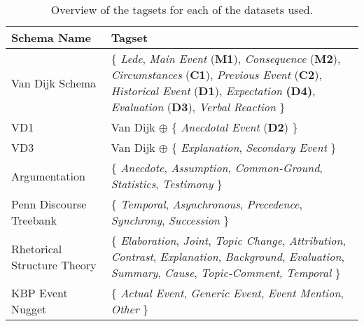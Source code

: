 \documentclass[11pt]{article}
\newcommand\nd{VD1\xspace}
\newcommand\spangh{VD3\xspace}
\begin{document}
\begin{table*}[t]
    \centering
    \begin{tabular}{|p{3cm}|p{12cm}|}
        \hline
        \textbf{Schema Name} & \textbf{Tagset} \\
        \hline
        \hline
         Van Dijk Schema &  $\{$ \textit{Lede},
        \textit{Main Event} (\textbf{M1}), \textit{Consequence} (\textbf{M2}), \textit{Circumstances} (\textbf{C1}), \textit{Previous Event} (\textbf{C2}), \textit{Historical Event} (\textbf{D1}), \textit{Expectation} \textbf{(D4)}, \textit{Evaluation} (\textbf{D3}), \textit{Verbal Reaction} $\}$ \\
        \hline
        \nd & Van Dijk $\oplus$ $\{$ \textit{Anecdotal Event} (\textbf{D2}) $\}$\\
        \hline
        \spangh & Van Dijk $\oplus$ $\{$ \textit{Explanation}, \textit{Secondary Event} $\}$ \\
        \hline
        \hline
        Argumentation & $\{$ \textit{Anecdote}, \textit{Assumption}, \textit{Common-Ground}, \textit{Statistics}, \textit{Testimony} $\}$ \\
        \hline
        \hline
        Penn Discourse Treebank & $\{$ \textit{Temporal}, \textit{Asynchronous}, \textit{Precedence}, \textit{Synchrony}, \textit{Succession} $\}$ \\
        \hline
        Rhetorical Structure Theory & $\{$ \textit{Elaboration}, \textit{Joint},  \textit{Topic Change},  \textit{Attribution}, \textit{Contrast}, \textit{Explanation}, \textit{Background},
        \textit{Evaluation}, \textit{Summary}, \textit{Cause}, \textit{Topic-Comment}, \textit{Temporal} $\}$ \\
        \hline
        KBP Event Nugget & $\{$ \textit{Actual Event}, \textit{Generic Event}, \textit{Event Mention}, \textit{Other} $\}$\\
        \hline
    \end{tabular}
    \caption{Overview of the tagsets for each of the datasets used.}
    \label{tab:dataset_tagsets}
\end{table*}
\end{document}
